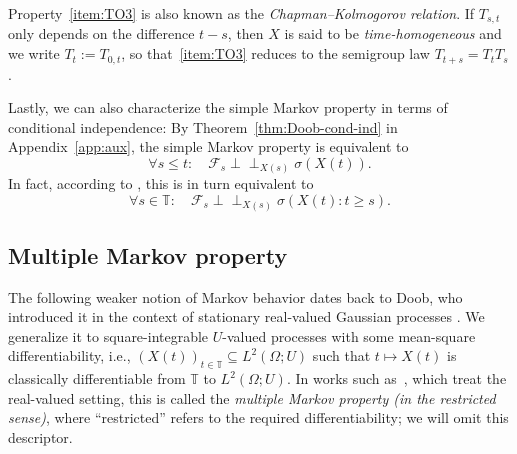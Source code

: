 \documentclass[reqno]{amsart}
\numberwithin{equation}{section}
\newcommand{\bbT}{\mathbb{T}}
\newcommand{\cF}{\mathcal{F}}
\newcommand{\ind}{\perp\!\!\!\perp}
\theoremstyle{remark}
\theoremstyle{definition}
\begin{document}
Property~\ref{item:TO3} is also known as the \emph{Chapman--Kolmogorov relation}.
If $T_{s,t}$ only depends on the difference $t-s$, then $X$ is said to be
\emph{time-homogeneous} and we write $T_{t} := T_{0,t}$, 
so that~\ref{item:TO3} reduces to the semigroup law $T_{t+s} = T_t T_s$.

Lastly, we can also characterize the simple Markov property in terms of conditional independence:
By Theorem~\ref{thm:Doob-cond-ind} in Appendix~\ref{app:aux},
the simple Markov property is equivalent to
%
\[
\forall s \le t : \quad  
\cF_s \ind_{X(s)} \sigma(X(t)).
\]
%
In fact, according to \cite[Lemma~11.1]{Kallenberg2002}, this
is in turn equivalent to
%
\begin{equation}
	\forall s \in \bbT : \quad  
	\cF_s \ind_{X(s)} \sigma(X(t) : t \ge s).
\end{equation}
%

\subsection{Multiple Markov property}
The following weaker notion of Markov behavior
dates back to Doob, who introduced it
in the context of stationary real-valued Gaussian processes \cite[pp.~271--272]{Doob1944}.
We generalize it to square-integrable $U$-valued processes
with some mean-square differentiability, i.e., 
$(X(t))_{t\in\bbT} \subseteq L^2(\Omega; U)$
such that $t \mapsto X(t)$ is classically differentiable
from $\bbT$ to $L^2(\Omega; U)$.
In works such as~\cite{HidaHitsuda1993, Rozanov1982},
which treat the real-valued setting,
this is called the
\emph{multiple Markov property (in the restricted sense)},
where ``restricted'' refers to the required differentiability; we will omit this descriptor.
\end{document}
